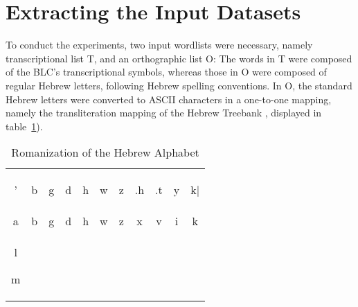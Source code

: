 \section{Extracting the Input Datasets}\label{sec:extr}
To conduct the experiments, two input wordlists were necessary, 
namely transcriptional list T, and an orthographic list O:
The words in T were composed of the \ac{BLC}'s transcriptional symbols, 
whereas those in O
were composed of regular Hebrew letters, following Hebrew spelling conventions. 
In O, the standard Hebrew letters were converted to ASCII characters in a one-to-one
mapping, namely the transliteration mapping of the Hebrew Treebank 
\citep{simaan-et-al:2001}, displayed in table~\ref{tab:ortho-alph}). %
\begin{table}[ht]
\centering
\caption{Romanization of the Hebrew Alphabet \citep{simaan-et-al:2001}}
\label{tab:ortho-alph}
\begin{tabular}{c c c c c c c c c c c}
\hline %
\begin{cjhebrew}'\end{cjhebrew} & \begin{cjhebrew}b\end{cjhebrew} & \begin{cjhebrew}g\end{cjhebrew} & \begin{cjhebrew}d\end{cjhebrew} 
& \begin{cjhebrew}h\end{cjhebrew} & \begin{cjhebrew}w\end{cjhebrew} & \begin{cjhebrew}z\end{cjhebrew}& \begin{cjhebrew}.h\end{cjhebrew}
& \begin{cjhebrew}.t\end{cjhebrew} & \begin{cjhebrew}y\end{cjhebrew} & \begin{cjhebrew}k|\end{cjhebrew} \\ 
a & b & g & d 
& h & w & z & x & v & i & k \\[12pt]
 \begin{cjhebrew}l\end{cjhebrew} \begin{cjhebrew}m\end{cjhebrew}

\end{tabular}
\end{table}
